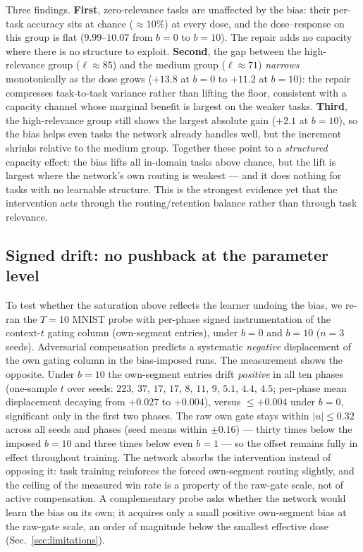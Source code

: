 \documentclass[review,12pt,number]{elsarticle}
\begin{document}
Three findings. \textbf{First}, zero-relevance tasks are unaffected by
the bias: their per-task accuracy sits at chance
($\approx 10\%$) at every dose, and the dose--response on this group
is flat ($9.99$--$10.07$ from $b{=}0$ to $b{=}10$). The repair adds
no capacity where there is no structure to exploit. \textbf{Second},
the gap between the high-relevance group ($\ell \approx 85$) and the
medium group ($\ell \approx 71$) \emph{narrows} monotonically as the
dose grows ($+13.8$ at $b{=}0$ to $+11.2$ at $b{=}10$): the repair
compresses task-to-task variance rather than lifting the floor,
consistent with a capacity channel whose marginal benefit is largest on
the weaker tasks. \textbf{Third}, the high-relevance group still shows
the largest absolute gain ($+2.1$ at $b{=}10$), so the bias helps even
tasks the network already handles well, but the increment shrinks
relative to the medium group. Together these point to a
\emph{structured} capacity effect: the bias lifts all in-domain tasks
above chance, but the lift is largest where the network's own routing
is weakest --- and it does nothing for tasks with no learnable
structure. This is the strongest evidence yet that the intervention
acts through the routing/retention balance rather than through task
relevance.

\subsection{Signed drift: no pushback at the parameter level}
\label{sec:sigdrift}

To test whether the saturation above reflects the learner undoing the
bias, we re-ran the $T{=}10$ MNIST probe with per-phase signed
instrumentation of the context-$t$ gating column (own-segment entries),
under $b{=}0$ and $b{=}10$ ($n{=}3$ seeds). Adversarial compensation
predicts a systematic \emph{negative} displacement of the own gating
column in the bias-imposed runs. The measurement shows the opposite.
Under $b{=}10$ the own-segment entries drift \emph{positive} in all ten
phases (one-sample $t$ over seeds: $223$, $37$, $17$, $17$, $8$, $11$,
$9$, $5.1$, $4.4$, $4.5$; per-phase mean displacement decaying from
$+0.027$ to $+0.004$), versus $\le +0.004$ under $b{=}0$, significant
only in the first two phases. The raw own gate stays within
$|u| \le 0.32$ across all seeds and phases (seed means within
$\pm 0.16$) --- thirty times below the imposed $b{=}10$ and three times
below even $b{=}1$ --- so the offset remains fully in effect throughout
training. The network absorbs the intervention instead of opposing it:
task training reinforces the forced own-segment routing slightly, and
the ceiling of the measured win rate is a property of the raw-gate
scale, not of active compensation. A complementary probe asks whether
the network would learn the bias on its own; it acquires only a small
positive own-segment bias at the raw-gate scale, an order of magnitude
below the smallest effective dose (Sec.~\ref{sec:limitations}).
\end{document}
